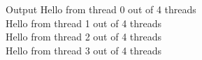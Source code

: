 \documentclass[slidestop,mathserif,compress,xcolor=svgnames]{beamer}
\newenvironment{eblock}[0]
{
\begin{beamerboxesrounded}[upper=uppercol2,lower=lowercol2,shadow=true]}
{\end{beamerboxesrounded}}
\begin{document}
\begin{frame}
\begin{columns}
  \end{columns}
  \begin{columns}
    \column{5cm}
    \begin{eblock}{Output}
      Hello from thread 0 out of 4 threads\\
      Hello from thread 1 out of 4 threads\\
      Hello from thread 2 out of 4 threads\\
      Hello from thread 3 out of 4 threads
    \end{eblock}
  \end{columns}
\end{frame}
\end{document}
